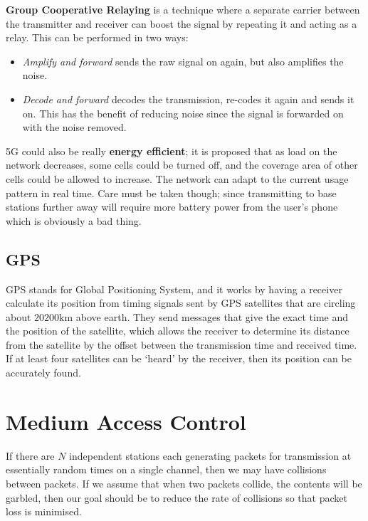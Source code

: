 \textbf{Group Cooperative Relaying} is a technique where a separate carrier
between the transmitter and receiver can boost the signal by repeating it and
acting as a relay. This can be performed in two ways:

\begin{itemize}
  \item \textit{Amplify and forward} sends the raw signal on again, but also
  amplifies the noise.
  \item \textit{Decode and forward} decodes the transmission, re-codes it again
  and sends it on. This has the benefit of reducing noise since the signal
  is forwarded on with the noise removed.
\end{itemize}

5G could also be really \textbf{energy efficient}; it is proposed that as load
on the network decreases, some cells could be turned off, and the coverage area
of other cells could be allowed to increase. The network can adapt to the
current usage pattern in real time. Care must be taken though; since
transmitting to base stations further away will require more battery power from
the user's phone which is obviously a bad thing.

\subsection{GPS}

GPS stands for Global Positioning System, and it works by having a receiver
calculate its position from timing signals sent by GPS satellites that are
circling about $20200\si{\kilo\meter}$ above earth. They send messages that give
the exact time and the position of the satellite, which allows the receiver to
determine its distance from the satellite by the offset between the transmission
time and received time. If at least four satellites can be `heard' by the
receiver, then its position can be accurately found.

\section{Medium Access Control}

If there are $N$ independent stations each generating packets for transmission
at essentially random times on a single channel, then we may have collisions
between packets. If we assume that when two packets collide, the contents will
be garbled, then our goal should be to reduce the rate of collisions so that
packet loss is minimised.

